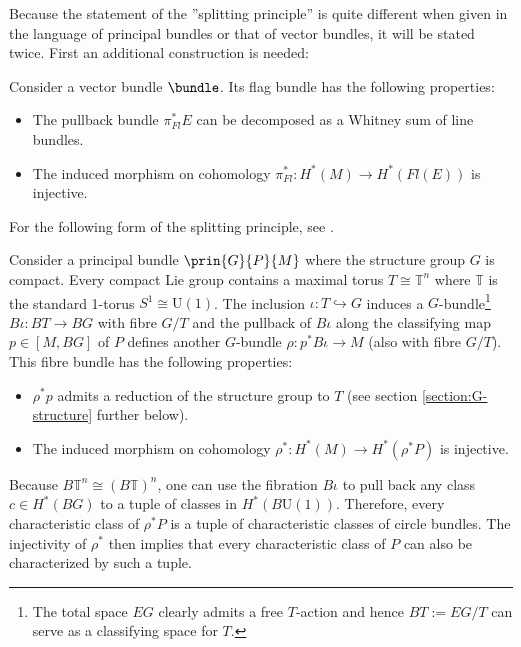     Because the statement of the ''splitting principle'' is quite different when given in the language of principal bundles or that of vector bundles, it will be stated twice. First an additional construction is needed:
    \begin{theorem}
        Consider a vector bundle $\bundle$. Its flag bundle has the following properties:
        \begin{itemize}
            \item The pullback bundle $\pi_{Fl}^*E$ can be decomposed as a Whitney sum of line bundles.
            \item The induced morphism on cohomology $\pi_{Fl}^*:H^*(M)\rightarrow H^*(Fl(E))$ is injective.
        \end{itemize}
    \end{theorem}
    For the following form of the splitting principle, see \cite{may_splitting, debray_characteristic}.
    \begin{theorem}
        Consider a principal bundle $\prin{G}{P}{M}$ where the structure group $G$ is compact. Every compact Lie group contains a maximal torus $T\cong\mathbb{T}^n$ where $\mathbb{T}$ is the standard 1-torus $S^1\cong\text{U}(1)$. The inclusion $\iota:T\hookrightarrow G$ induces a $G$-bundle\footnote{The total space $EG$ clearly admits a free $T$-action and hence $BT:=EG/T$ can serve as a classifying space for $T$.} $B\iota:BT\rightarrow BG$ with fibre $G/T$ and the pullback of $B\iota$ along the classifying map $p\in[M, BG]$ of $P$ defines another $G$-bundle $\rho:p^*B\iota\rightarrow M$ (also with fibre $G/T$). This fibre bundle has the following properties:
        \begin{itemize}
            \item $\rho^*p$ admits a reduction of the structure group to $T$ (see section \ref{section:G-structure} further below).
            \item The induced morphism on cohomology $\rho^*:H^*(M)\rightarrow H^*(\rho^*P)$ is injective.
        \end{itemize}
    \end{theorem}
    Because $B\mathbb{T}^n\cong(B\mathbb{T})^n$, one can use the fibration $B\iota$ to pull back any class $c\in H^*(BG)$ to a tuple of classes in $H^*(B\text{U}(1))$. Therefore, every characteristic class of $\rho^*P$ is a tuple of characteristic classes of circle bundles. The injectivity of $\rho^*$ then implies that every characteristic class of $P$ can also be characterized by such a tuple.

